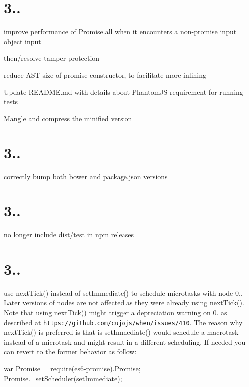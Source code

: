 \section*{3..}


\begin{DoxyItemize}
\item improve performance of Promise.\+all when it encounters a non-\/promise input object input
\item then/resolve tamper protection
\item reduce A\+ST size of promise constructor, to facilitate more inlining
\item Update R\+E\+A\+D\+M\+E.\+md with details about Phantom\+JS requirement for running tests
\item Mangle and compress the minified version
\end{DoxyItemize}

\section*{3..}


\begin{DoxyItemize}
\item correctly bump both bower and package.\+json versions
\end{DoxyItemize}

\section*{3..}


\begin{DoxyItemize}
\item no longer include dist/test in npm releases
\end{DoxyItemize}

\section*{3..}


\begin{DoxyItemize}
\item use next\+Tick() instead of set\+Immediate() to schedule microtasks with node 0.. Later versions of nodes are not affected as they were already using next\+Tick(). Note that using next\+Tick() might trigger a depreciation warning on 0. as described at \href{https://github.com/cujojs/when/issues/410}{\tt https\+://github.\+com/cujojs/when/issues/410}. The reason why next\+Tick() is preferred is that is set\+Immediate() would schedule a macrotask instead of a microtask and might result in a different scheduling. If needed you can revert to the former behavior as follow\+:

var Promise = require(\textquotesingle{}es6-\/promise\textquotesingle{}).Promise; Promise.\+\_\+set\+Scheduler(set\+Immediate);
\end{DoxyItemize}

